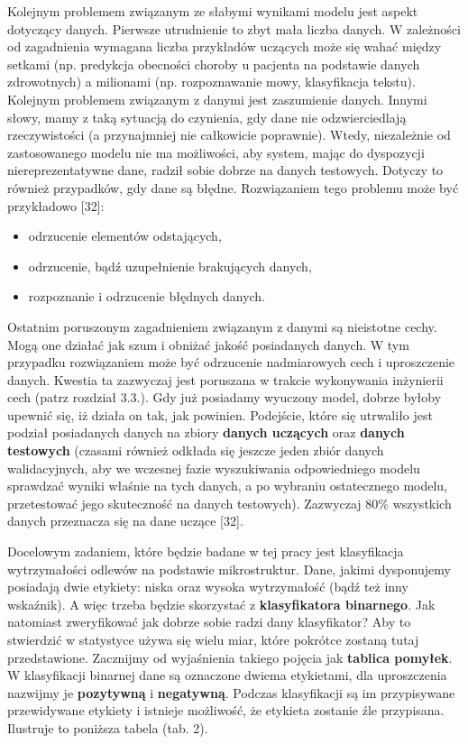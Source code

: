 Kolejnym problemem związanym ze słabymi wynikami modelu jest aspekt dotyczący danych. Pierwsze utrudnienie to zbyt mała liczba danych. W zależności od zagadnienia wymagana liczba przykładów uczących może się wahać między setkami (np. predykcja obecności choroby u pacjenta na podstawie danych zdrowotnych) a milionami (np. rozpoznawanie mowy, klasyfikacja tekstu). Kolejnym problemem związanym z danymi jest zaszumienie danych. Innymi słowy, mamy z taką sytuacją do czynienia, gdy dane nie odzwierciedlają rzeczywistości (a przynajmniej nie całkowicie poprawnie). Wtedy, niezależnie od zastosowanego modelu nie ma możliwości, aby system, mając do dyspozycji niereprezentatywne dane, radził sobie dobrze na danych testowych. Dotyczy to również przypadków, gdy dane są błędne. Rozwiązaniem tego problemu może być przykładowo [32]:
\begin{itemize}
\item
odrzucenie elementów odstających,
\item
odrzucenie, bądź uzupełnienie brakujących danych,
\item
rozpoznanie i odrzucenie błędnych danych.
\end{itemize}

Ostatnim poruszonym zagadnieniem  związanym z danymi są nieistotne cechy. Mogą one działać jak szum i obniżać jakość posiadanych danych. W tym przypadku rozwiązaniem może być odrzucenie nadmiarowych cech i uproszczenie danych. Kwestia ta zazwyczaj jest poruszana w trakcie wykonywania inżynierii cech (patrz rozdział 3.3.).
Gdy już posiadamy wyuczony model, dobrze byłoby upewnić się, iż działa on tak, jak powinien. Podejście, które się utrwaliło jest podział posiadanych danych na zbiory \textbf{danych uczących} oraz \textbf{danych testowych} (czasami również odkłada się jeszcze jeden zbiór danych walidacyjnych, aby we wczesnej fazie wyszukiwania odpowiedniego modelu sprawdzać wyniki właśnie na tych danych, a po wybraniu ostatecznego modelu, przetestować jego skuteczność na danych testowych). Zazwyczaj 80\% wszystkich danych przeznacza się na dane uczące [32].

Docelowym zadaniem, które będzie badane w tej pracy jest klasyfikacja wytrzymałości odlewów na podstawie mikrostruktur. Dane, jakimi dysponujemy posiadają dwie etykiety: niska oraz wysoka wytrzymałość (bądź też inny wskaźnik). A więc trzeba będzie skorzystać z \textbf{klasyfikatora binarnego}. Jak natomiast zweryfikować jak dobrze sobie radzi dany klasyfikator? Aby to stwierdzić w statystyce używa się wielu miar, które pokrótce zostaną tutaj przedstawione. Zacznijmy od wyjaśnienia takiego pojęcia jak \textbf{tablica pomyłek}. W klasyfikacji binarnej dane są oznaczone dwiema etykietami, dla uproszczenia nazwijmy je \textbf{pozytywną} i \textbf{negatywną}. Podczas klasyfikacji są im przypisywane przewidywane etykiety i istnieje możliwość, że etykieta zostanie źle przypisana. Ilustruje to poniższa tabela (tab. 2).

